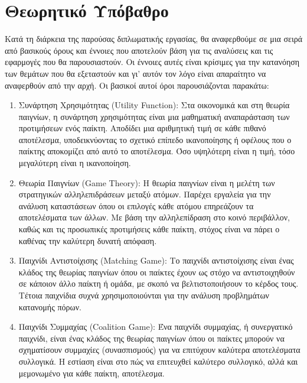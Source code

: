 \section{Θεωρητικό Υπόβαθρο}

Κατά τη διάρκεια της παρούσας διπλωματικής εργασίας, θα αναφερθούμε σε μια σειρά από βασικούς όρους και έννοιες που αποτελούν βάση για τις αναλύσεις και τις εφαρμογές που θα παρουσιαστούν. Οι έννοιες αυτές είναι κρίσιμες για την κατανόηση των θεμάτων που θα εξεταστούν και γι' αυτόν τον λόγο είναι απαραίτητο να αναφερθούν από την αρχή. Οι βασικοί αυτοί όροι παρουσιάζονται παρακάτω:

\begin{enumerate}
    \item Συνάρτηση Χρησιμότητας (Utility Function): Στα οικονομικά και στη θεωρία παιγνίων, η συνάρτηση χρησιμότητας είναι μια μαθηματική αναπαράσταση των προτιμήσεων ενός παίκτη. Αποδίδει μια αριθμητική τιμή σε κάθε πιθανό αποτέλεσμα, υποδεικνύοντας το σχετικό επίπεδο ικανοποίησης ή οφέλους που ο παίκτης αποκομίζει από αυτό το αποτέλεσμα. Όσο υψηλότερη είναι η τιμή, τόσο μεγαλύτερη είναι η ικανοποίηση. 

    \item Θεωρία Παιγνίων (Game Theory): Η θεωρία παιγνίων είναι η μελέτη των στρατηγικών αλληλεπιδράσεων μεταξύ ατόμων. Παρέχει εργαλεία για την ανάλυση καταστάσεων όπου οι επιλογές κάθε ατόμου επηρεάζουν τα αποτελέσματα των άλλων. Με βάση την αλληλεπίδραση στο κοινό περιβάλλον, καθώς και τις προσωπικές προτιμήσεις κάθε παίκτη, στόχος είναι να πάρει ο καθένας την καλύτερη δυνατή απόφαση. 

    \item Παιχνίδι Αντιστοίχισης (Matching Game): Το παιχνίδι αντιστοίχισης είναι ένας κλάδος της θεωρίας παιγνίων όπου οι παίκτες έχουν ως στόχο να αντιστοιχηθούν σε κάποιον άλλο παίκτη ή ομάδα, με σκοπό να βελτιστοποιήσουν το κέρδος τους. Τέτοια παιχνίδια συχνά χρησιμοποιούνται για την ανάλυση προβλημάτων κατανομής πόρων. 

    \item Παιχνίδι Συμμαχίας (Coalition Game): Ένα παιχνίδι συμμαχίας, ή συνεργατικό παιχνίδι, είναι ένας κλάδος της θεωρίας παιγνίων όπου οι παίκτες μπορούν να σχηματίσουν συμμαχίες (συνασπισμούς) για να επιτύχουν καλύτερα αποτελέσματα συλλογικά. Η εστίαση είναι στο πώς να επιτευχθεί καλύτερο συλλογικό, αλλά και μεμονωμένο για κάθε παίκτη, αποτέλεσμα. 


\end{enumerate}
